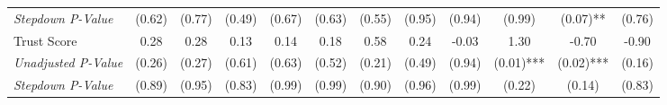 \begin{tabular}{l c c c c c c c c c c c}
\quad \textit{Stepdown P-Value} & (0.62) & (0.77) & (0.49) & (0.67) & (0.63) & (0.55) & (0.95) & (0.94) & (0.99) & (0.07)** & (0.76) \\
Trust Score & 0.28 & 0.28 & 0.13 & 0.14 & 0.18 & 0.58 & 0.24 & -0.03 & 1.30 & -0.70 & -0.90 \\
\quad \textit{Unadjusted P-Value} & (0.26) & (0.27) & (0.61) & (0.63) & (0.52) & (0.21) & (0.49) & (0.94) & (0.01)*** & (0.02)*** & (0.16) \\
\quad \textit{Stepdown P-Value} & (0.89) & (0.95) & (0.83) & (0.99) & (0.99) & (0.90) & (0.96) & (0.99) & (0.22) & (0.14) & (0.83) \\
\bottomrule
\end{tabular}
